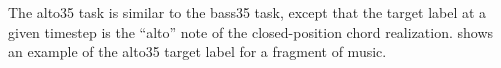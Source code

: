 
The \gls{alto35} task is similar to the \gls{bass35} task,
except that the target label at a given timestep is the
``alto'' note of the \gls{closed-position} chord
realization.  shows an example
of the \gls{alto35} target label for a fragment of music.




